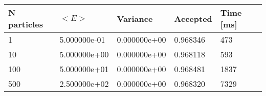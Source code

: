 \begin{table}[h!]
\begin{tabular}{|l|l|l|l|l|}
\hline 
N particles & $<E>$ & Variance & Accepted & Time [ms]\\ 
 \hline 
1 & 5.000000e-01 & 0.000000e+00 & 0.968346 & 473 \\ \hline 
10 & 5.000000e+00 & 0.000000e+00 & 0.968118 & 593 \\ \hline 
100 & 5.000000e+01 & 0.000000e+00 & 0.968481 & 1837 \\ \hline 
500 & 2.500000e+02 & 0.000000e+00 & 0.968320 & 7329 \\ \hline 
\end{tabular}
\label{h:a1} 
\end{table}

